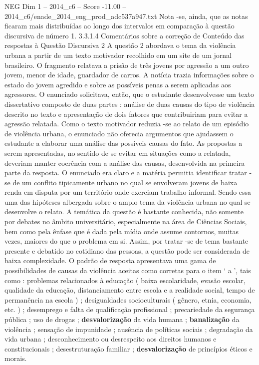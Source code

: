 \begin{textsample}{NEG Dim 1 – 2014\_c6 – Score -11.00 – 2014\_c6/enade\_2014\_eng\_prod\_adc537a947.txt}
Nota -se, ainda, que as notas ficaram mais distribuídas ao longo dos intervalos em comparação à questão discursiva de número 1. 3.3.1.4 Comentários sobre a correção de Conteúdo das respostas à Questão Discursiva 2 A questão 2 abordava o tema da violência urbana a partir de um texto motivador recolhido em um site de um jornal brasileiro.
O fragmento relatava a prisão de três jovens por agressão a um outro jovem, menor de idade, guardador de carros.
A notícia trazia informações sobre o estado do jovem agredido e sobre as possíveis penas a serem aplicadas aos agressores.
O enunciado solicitava, então, que o estudante desenvolvesse um texto dissertativo composto de duas partes : análise de duas causas do tipo de violência descrito no texto e apresentação de dois fatores que contribuiriam para evitar a agressão relatada.
Como o texto motivador reduzia -se ao relato de um episódio de violência urbana, o enunciado não oferecia argumentos que ajudassem o estudante a elaborar uma análise das possíveis causas do fato.
As propostas a serem apresentadas, no sentido de se evitar em situações como a relatada, deveriam manter coerência com a análise das causas, desenvolvida na primeira parte da resposta.
O enunciado era claro e a matéria permitia identificar tratar -se de um conflito tipicamente urbano no qual se envolveram jovens de baixa renda em disputa por um território onde exerciam trabalho informal.
Sendo essa uma das hipóteses albergada sobre o amplo tema da violência urbana no qual se desenvolve o relato.
A temática da questão é bastante conhecida, não somente por debates no âmbito universitário, especialmente na área de Ciências Sociais, bem como pela ênfase que é dada pela mídia onde assume contornos, muitas vezes, maiores do que o problema em si.
Assim, por tratar -se de tema bastante presente e debatido no cotidiano das pessoas, a questão pode ser considerada de baixa complexidade.
O padrão de resposta apresentava uma gama de possibilidades de causas da violência aceitas como corretas para o item ‘ a ’, tais como : problemas relacionados à educação ( baixa escolaridade, evasão escolar, qualidade da educação, distanciamento entre escola e a realidade social, tempo de permanência na escola ) ; desigualdades socioculturais ( gênero, etnia, economia, etc. ) ; desemprego e falta de qualificação profissional ; precariedade da segurança pública ; uso de drogas ; \textbf{desvalorização} da vida humana ; \textbf{banalização} da violência ; sensação de impunidade ; ausência de políticas sociais ; degradação da vida urbana ; desconhecimento ou desrespeito aos direitos humanos e constitucionais ; desestruturação familiar ; \textbf{desvalorização} de princípios éticos e morais.

\end{textsample}
